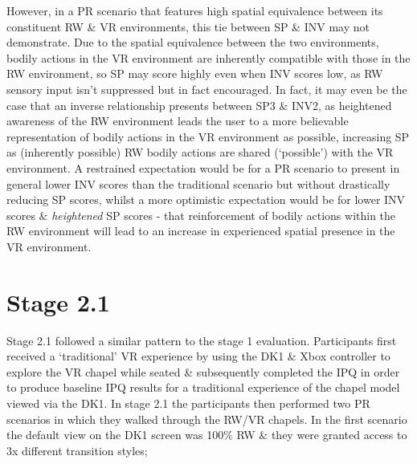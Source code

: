 However, in a PR scenario that features high spatial equivalence between its constituent RW \& VR environments, this tie between SP \& INV may not demonstrate. Due to the spatial equivalence between the two environments, bodily actions in the VR environment are inherently compatible with those in the RW environment, so SP may score highly even when INV scores low, as RW sensory input isn't suppressed but in fact encouraged. In fact, it may even be the case that an inverse relationship presents between SP3 \& INV2, as heightened awareness of the RW environment leads the user to a more believable representation of bodily actions in the VR environment as possible, increasing SP as (inherently possible) RW bodily actions are shared (`possible') with the VR environment. A restrained expectation would be for a PR scenario to present in general lower INV scores than the traditional scenario but without drastically reducing SP scores, whilst a more optimistic expectation would be for lower INV scores \& \textit{heightened} SP scores - that reinforcement of bodily actions within the RW environment will lead to an increase in experienced spatial presence in the VR environment.





\section{Stage 2.1}

Stage 2.1 followed a similar pattern to the stage 1 evaluation. Participants first received a `traditional' VR experience by using the DK1 \& Xbox controller to explore the VR chapel while seated \& subsequently completed the IPQ in order to produce baseline IPQ results for a traditional experience of the chapel model viewed via the DK1. In stage 2.1 the participants then performed two PR scenarios in which they walked through the RW/VR chapels. In the first scenario the default view on the DK1 screen was 100\% RW \& they were granted access to 3x different transition styles;

